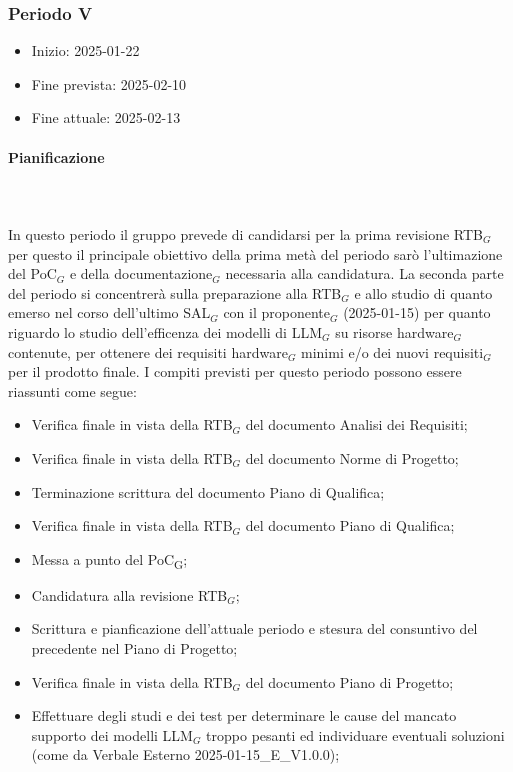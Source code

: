 \subsubsection{Periodo V}

\begin{itemize}
    \item Inizio: 2025-01-22
    \item Fine prevista: 2025-02-10
    \item Fine attuale: 2025-02-13
\end{itemize}
\paragraph{Pianificazione} \hspace{1cm}
\\ \hspace{1cm} \\

In questo periodo il gruppo prevede di candidarsi per la prima revisione RTB$_G$ per questo il principale obiettivo della prima metà del periodo sarò l'ultimazione del PoC$_G$ e della documentazione$_G$ necessaria alla candidatura. La seconda parte del periodo si concentrerà sulla preparazione alla RTB$_G$ e allo studio di quanto emerso nel corso dell'ultimo SAL$_G$ con il proponente$_G$ (2025-01-15) per quanto riguardo lo studio dell'efficenza dei modelli di LLM$_G$ su risorse hardware$_G$ contenute, per ottenere dei requisiti hardware$_G$ minimi e/o dei nuovi requisiti$_G$ per il prodotto finale.
I compiti previsti per questo periodo possono essere riassunti come segue:  
\begin{itemize}
    \item Verifica finale in vista della RTB$_G$ del documento Analisi dei Requisiti;
    \item Verifica finale in vista della RTB$_G$ del documento Norme di Progetto;
    \item Terminazione scrittura del documento Piano di Qualifica;
    \item Verifica finale in vista della RTB$_G$ del documento Piano di Qualifica;
    \item Messa a punto del PoC\textsubscript{G};
    \item Candidatura alla revisione RTB$_G$;
    \item Scrittura e pianficazione  dell'attuale periodo e stesura del consuntivo del precedente nel Piano di Progetto;
    \item Verifica finale in vista della RTB$_G$ del documento Piano di Progetto;
    \item Effettuare degli studi e dei test per determinare le cause del mancato supporto dei modelli LLM$_G$ troppo pesanti ed individuare eventuali soluzioni (come da Verbale Esterno 2025-01-15\_E\_V1.0.0);
    
\end{itemize}


